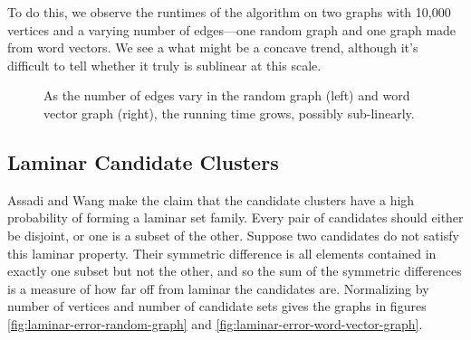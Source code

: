 \documentclass[
]{article}
\begin{document}
To do this, we observe the runtimes of the algorithm on two graphs with 10,000
vertices and a varying number of edges---one random graph and one graph made
from word vectors. We see a what might be a concave trend, although it's difficult to
tell whether it truly is sublinear at this scale.

\begin{figure}[!htb]
  \caption{\label{fig:running-time-c-varies}
    As the number of edges vary in the random graph (left) and word vector graph (right),
    the running time grows, possibly sub-linearly.}
\end{figure}

\hypertarget{laminar-candidate-clusters}{%
  \subsection{Laminar Candidate
    Clusters}\label{laminar-candidate-clusters}}

Assadi and Wang make the claim that the candidate clusters have a high
probability of forming a laminar set family. Every pair of candidates
should either be disjoint, or one is a subset of the other. Suppose two
candidates do not satisfy this laminar property. Their symmetric
difference is all elements contained in exactly one subset but not the
other, and so the sum of the symmetric differences is a measure of how
far off from laminar the candidates are. Normalizing by number of
vertices and number of candidate sets gives the graphs in figures \ref{fig:laminar-error-random-graph} and \ref{fig:laminar-error-word-vector-graph}.
\end{document}
